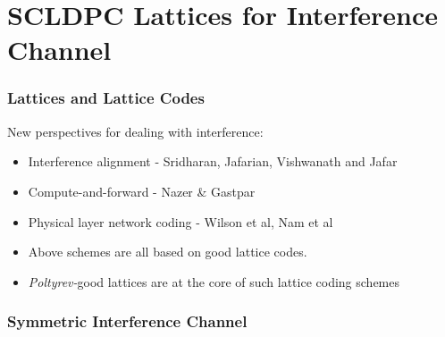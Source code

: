 \section{SCLDPC Lattices for Interference Channel}
\begin{frame}\frametitle{Lattices and Lattice Codes}
	New perspectives for dealing with interference:
      \begin{itemize}
     		\item Interference alignment - Sridharan, Jafarian, Vishwanath and Jafar
			\item Compute-and-forward - Nazer \& Gastpar
			\item Physical layer network coding - Wilson et al, Nam et al
      \end{itemize}

\begin{block}{}
		\begin{itemize}
			\item Above schemes are all based on good lattice codes.
			\item	\textit{Poltyrev-}good lattices are at the core of such lattice coding schemes
		\end{itemize}
\end{block}
\end{frame}

\begin{frame}\frametitle{Symmetric Interference Channel}
	\begin{figure}
		\centering
	\end{figure}
\end{frame}  

